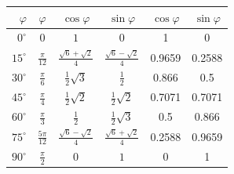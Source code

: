 \begin{minipage}{\linewidth}
\begin{tabular}{rcccS[table-format=1.4]S[table-format=1.4]}
\toprule
$\displaystyle \varphi$ & $\displaystyle \varphi$ & $\displaystyle \cos \varphi$ & $\displaystyle \sin \varphi$ &  &  \\
\midrule
\textcolor{\colblack}{$\displaystyle 0^\circ$} & \textcolor{\colblack}{$\displaystyle 0$} & \textcolor{\colblack}{$\displaystyle 1$} & \textcolor{\colblack}{$\displaystyle 0$} &  &  \\
\midrule
\textcolor{\colgray}{$\displaystyle 15^\circ$} & \textcolor{\colgray}{$\displaystyle \frac{\pi}{12}$} & \textcolor{\colgray}{$\displaystyle \frac{\sqrt{6}+\sqrt{2}}{4}$} & \textcolor{\colgray}{$\displaystyle \frac{\sqrt{6}-\sqrt{2}}{4}$} & \textcolor{\colgray}{0.9659} & \textcolor{\colgray}{0.2588} \\
\textcolor{\colblue}{$\displaystyle 30^\circ$} & \textcolor{\colblue}{$\displaystyle \frac{\pi}{6}$} & \textcolor{\colblue}{$\displaystyle \frac{1}{2}\sqrt{3}$} & \textcolor{\colblue}{$\displaystyle \frac{1}{2}$} & \textcolor{\colblue}{0.866} & \textcolor{\colblue}{0.5} \\
\textcolor{\colred}{$\displaystyle 45^\circ$} & \textcolor{\colred}{$\displaystyle \frac{\pi}{4}$} & \textcolor{\colred}{$\displaystyle \frac{1}{2}\sqrt{2}$} & \textcolor{\colred}{$\displaystyle \frac{1}{2}\sqrt{2}$} & \textcolor{\colred}{0.7071} & \textcolor{\colred}{0.7071} \\
\textcolor{\colblue}{$\displaystyle 60^\circ$} & \textcolor{\colblue}{$\displaystyle \frac{\pi}{3}$} & \textcolor{\colblue}{$\displaystyle \frac{1}{2}$} & \textcolor{\colblue}{$\displaystyle \frac{1}{2}\sqrt{3}$} & \textcolor{\colblue}{0.5} & \textcolor{\colblue}{0.866} \\
\textcolor{\colgray}{$\displaystyle 75^\circ$} & \textcolor{\colgray}{$\displaystyle \frac{5\pi}{12}$} & \textcolor{\colgray}{$\displaystyle \frac{\sqrt{6}-\sqrt{2}}{4}$} & \textcolor{\colgray}{$\displaystyle \frac{\sqrt{6}+\sqrt{2}}{4}$} & \textcolor{\colgray}{0.2588} & \textcolor{\colgray}{0.9659} \\
\midrule
\textcolor{\colblack}{$\displaystyle 90^\circ$} & \textcolor{\colblack}{$\displaystyle \frac{\pi}{2}$} & \textcolor{\colblack}{$\displaystyle 0$} & \textcolor{\colblack}{$\displaystyle 1$} &  &  \\

\end{tabular}
\end{minipage}

